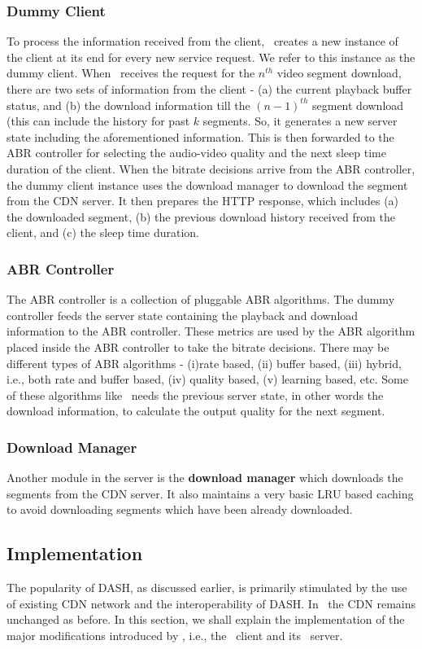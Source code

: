 \subsubsection{Dummy Client} 
To process the information received from the client, \servname\  creates a new instance of the client  at its end for every new service request. We refer to this instance as the dummy client. When \servname\ receives the request for the $n^{th}$ video segment download, there are two sets of information from the client - (a)  the current playback buffer status, and (b) the download information till the $(n-1)^{th}$ segment download (this can include the history for past $k$ segments. So, it generates a new server state including the aforementioned information. This is then forwarded to the \ac{ABR} controller for selecting the audio-video quality and the next sleep time duration of the client. When the bitrate decisions arrive from the \ac{ABR} controller, the dummy client instance uses the download manager to download the segment from the \ac{CDN} server. It then prepares the HTTP response, which includes (a) the downloaded segment, (b) the previous download history received from the client, and (c) the sleep time duration. 
\subsubsection{ABR Controller}  The ABR controller is a collection of pluggable ABR algorithms. The dummy controller feeds the server state containing the playback and download information to the ABR controller. These metrics are used by the \ac{ABR} algorithm placed inside the ABR controller to take the bitrate decisions. There may be different types of ABR algorithms - (i)rate based, (ii) buffer based, (iii) hybrid, i.e., both rate and buffer based, (iv) quality based, (v) learning based, etc. Some of these algorithms like~\cite{Mao2017,Akhtar2018,Sengupta2018} needs the previous server state, in other words the download information, to calculate the output quality for the next segment.
\subsubsection{Download Manager}
Another module in the server is the \textbf{download manager} which downloads the segments from the CDN server. It also maintains a very basic LRU based caching to avoid downloading segments which have been already downloaded.
\subsection{Implementation}
The popularity of DASH, as discussed earlier, is primarily stimulated by the use of existing \ac{CDN} network and the interoperability of \ac{DASH}. In \bel\ the \ac{CDN} remains unchanged as before. In this section, we shall explain the implementation of the major modifications introduced by \bel, i.e., the \bel\ client and its \servname\ server. 


